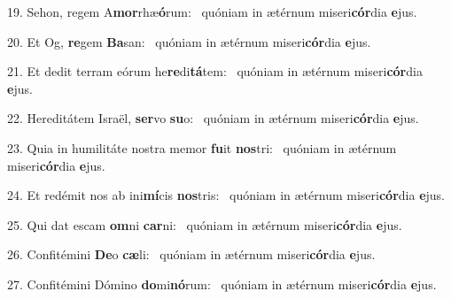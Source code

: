 19. Sehon, regem A\textbf{mor}rhæ\textbf{ó}rum: \ast\  quóniam in ætérnum miseri\textbf{cór}dia \textbf{e}jus.\

20. Et Og, \textbf{re}gem \textbf{Ba}san: \ast\  quóniam in ætérnum miseri\textbf{cór}dia \textbf{e}jus.\

21. Et dedit terram eórum he\textbf{re}di\textbf{tá}tem: \ast\  quóniam in ætérnum miseri\textbf{cór}dia \textbf{e}jus.\

22. Hereditátem Israël, \textbf{ser}vo \textbf{su}o: \ast\  quóniam in ætérnum miseri\textbf{cór}dia \textbf{e}jus.\

23. Quia in humilitáte nostra memor \textbf{fu}it \textbf{nos}tri: \ast\  quóniam in ætérnum miseri\textbf{cór}dia \textbf{e}jus.\

24. Et redémit nos ab ini\textbf{mí}cis \textbf{nos}tris: \ast\  quóniam in ætérnum miseri\textbf{cór}dia \textbf{e}jus.\

25. Qui dat escam \textbf{om}ni \textbf{car}ni: \ast\  quóniam in ætérnum miseri\textbf{cór}dia \textbf{e}jus.\

26. Confitémini \textbf{De}o \textbf{cæ}li: \ast\  quóniam in ætérnum miseri\textbf{cór}dia \textbf{e}jus.\

27. Confitémini Dómino \textbf{do}mi\textbf{nó}rum: \ast\  quóniam in ætérnum miseri\textbf{cór}dia \textbf{e}jus.\

